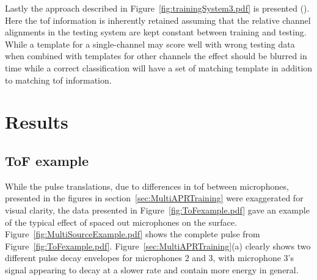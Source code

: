 Lastly the approach described in Figure~\ref{fig:trainingSystem3.pdf} is presented (). Here the \gls{tof} information is inherently retained assuming that the relative channel alignments in the testing system are kept constant between training and testing. While a template for a single-channel may score well with wrong testing data when combined with templates for other channels the effect should be blurred in time while a correct classification will have a set of matching template in addition to matching \gls{tof} information.

\section{Results}\label{sec:MultiAPRResults}
\subsection{ToF example}
While the pulse translations, due to differences in \gls{tof} between microphones, presented in the figures in section~\ref{sec:MultiAPRTraining} were exaggerated for visual clarity, the data presented in Figure~\ref{fig:ToFexample.pdf} gave an example of the typical effect of spaced out microphones on the surface. Figure~\ref{fig:MultiSourceExample.pdf} shows the complete pulse from Figure~\ref{fig:ToFexample.pdf}. Figure~\ref{sec:MultiAPRTraining}(a) clearly shows two different pulse decay envelopes for microphones 2 and 3, with microphone 3's signal appearing to decay at a slower rate and contain more energy in general.

